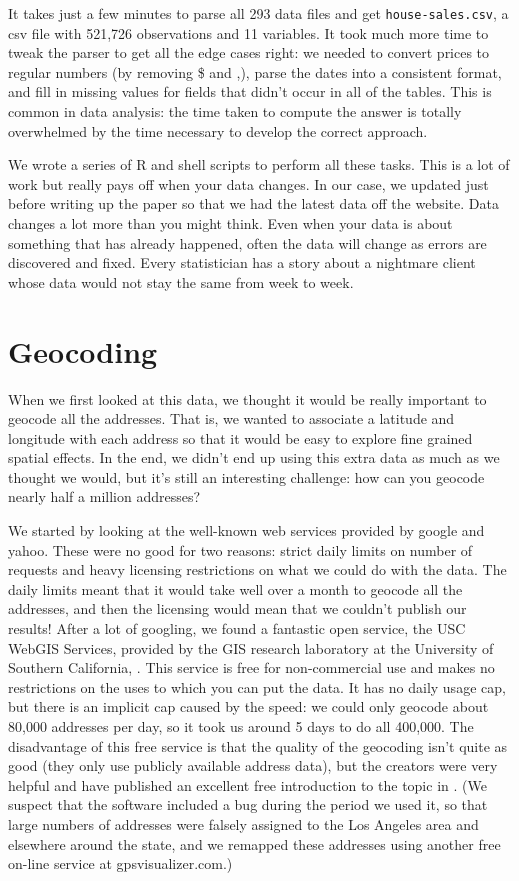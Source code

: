 \documentclass[oneside]{article}
\begin{document}
It takes just a few minutes to parse all 293 data files and get {\tt house-sales.csv}, a csv file with 521,726 observations and 11 variables.  It took much more time to tweak the parser to get all the edge cases right: we needed to convert prices to regular numbers (by removing \$ and ,), parse the dates into a consistent format, and fill in missing values for fields that didn't occur in all of the tables.  This is common in data analysis: the time taken to compute the answer is totally overwhelmed by the time necessary to develop the correct approach.

We wrote a series of R and shell scripts to perform all these tasks. This is a lot of work but really pays off when your data changes.  In our case, we updated just before writing up the paper so that we had the latest data off the website.  Data changes a lot more than you might think.  Even when your data is about something that has already happened, often the data will change  as errors are discovered and fixed.  Every statistician has a story about a nightmare client whose data would not stay the same from week to week.

\section{Geocoding} 

When we first looked at this data, we thought it would be really important to geocode all the addresses.  That is, we wanted to associate a latitude and longitude with each address so that it would be easy to explore fine grained spatial effects.  In the end, we didn't end up using this extra data as much as we thought we would, but it's still an interesting challenge: how can you geocode nearly half a million addresses?  

We started by looking at the well-known web services provided by google and yahoo.  These were no good for two reasons: strict daily limits on number of requests and heavy licensing restrictions on what we could do with the data.  The daily limits meant that it would take well over a month to geocode all the addresses, and then the licensing would mean that we couldn't publish our results!  After a lot of googling, we found a fantastic open service, the USC WebGIS Services, provided by the GIS research laboratory at the University of Southern California, \citet{uscgis}.  This service is free for non-commercial use and makes no restrictions on the uses to which you can put the data.  It has no daily usage cap, but there is an implicit cap caused by the speed: we could only geocode about 80,000 addresses per day, so it took us around 5 days to do all 400,000.  The disadvantage of this free service is that the quality of the geocoding isn't quite as good (they only use publicly available address data), but the creators were very helpful and have published an excellent free introduction to the topic in \citet{goldberg:2008}.  (We suspect that the software included a bug during the period we used it, so that large numbers of addresses were falsely assigned to the Los Angeles area and elsewhere around the state, and we remapped these addresses using another free on-line service at gpsvisualizer.com.)
\end{document}
